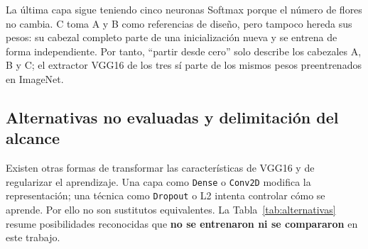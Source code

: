 \documentclass[11pt,letterpaper]{article}
\begin{document}
La última capa sigue teniendo cinco neuronas Softmax porque el número de flores
no cambia. C toma A y B como referencias de diseño, pero tampoco hereda sus
pesos: su cabezal completo parte de una inicialización nueva y se entrena de
forma independiente. Por tanto, ``partir desde cero'' solo describe los
cabezales A, B y C; el extractor VGG16 de los tres sí parte de los mismos pesos
preentrenados en ImageNet.

\subsection{Alternativas no evaluadas y delimitación del alcance}
Existen otras formas de transformar las características de VGG16 y de
regularizar el aprendizaje. Una capa como \texttt{Dense} o \texttt{Conv2D}
modifica la representación; una técnica como \texttt{Dropout} o L2 intenta
controlar cómo se aprende. Por ello no son sustitutos equivalentes. La
Tabla~\ref{tab:alternativas} resume posibilidades reconocidas que \textbf{no
se entrenaron ni se compararon} en este trabajo.
\end{document}
